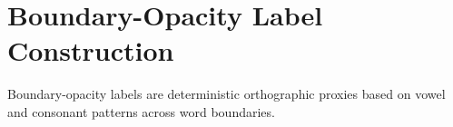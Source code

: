 \section{Boundary-Opacity Label Construction}
Boundary-opacity labels are deterministic orthographic proxies based on vowel and consonant patterns across word boundaries.
